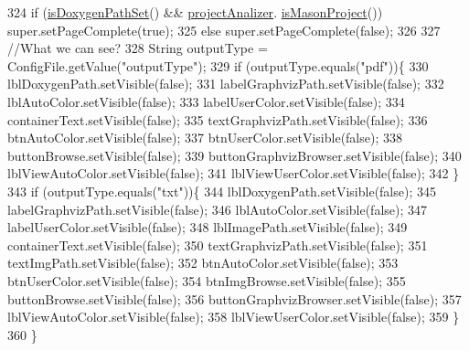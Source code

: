 \begin{DoxyCode}
324         \textcolor{keywordflow}{if} (\hyperlink{classit_1_1isislab_1_1masonhelperdocumentation_1_1mason_1_1wizards_1_1_b___project_information_page_a0eec0bf0cf4211e377555c20f52abdb8}{isDoxygenPathSet}() && \hyperlink{classit_1_1isislab_1_1masonhelperdocumentation_1_1mason_1_1wizards_1_1_b___project_information_page_aa0397b2de6a01a90d6d2eb52645f5173}{projectAnalizer}.
      \hyperlink{classit_1_1isislab_1_1masonhelperdocumentation_1_1analizer_1_1_project_analizer_a57a1bbfb21c09b106d6fa90ad3709d35}{isMasonProject}()) super.setPageComplete(\textcolor{keyword}{true});
325         \textcolor{keywordflow}{else}    super.setPageComplete(\textcolor{keyword}{false});
326         
327         \textcolor{comment}{//What we can see?}
328         String outputType = ConfigFile.getValue(\textcolor{stringliteral}{"outputType"});
329         \textcolor{keywordflow}{if} (outputType.equals(\textcolor{stringliteral}{"pdf"}))\{
330             lblDoxygenPath.setVisible(\textcolor{keyword}{false});
331             labelGraphvizPath.setVisible(\textcolor{keyword}{false});
332             lblAutoColor.setVisible(\textcolor{keyword}{false});
333             labelUserColor.setVisible(\textcolor{keyword}{false});
334             containerText.setVisible(\textcolor{keyword}{false});
335             textGraphvizPath.setVisible(\textcolor{keyword}{false});
336             btnAutoColor.setVisible(\textcolor{keyword}{false});
337             btnUserColor.setVisible(\textcolor{keyword}{false});
338             buttonBrowse.setVisible(\textcolor{keyword}{false});
339             buttonGraphvizBrowser.setVisible(\textcolor{keyword}{false});
340             lblViewAutoColor.setVisible(\textcolor{keyword}{false});
341             lblViewUserColor.setVisible(\textcolor{keyword}{false});
342         \}
343         \textcolor{keywordflow}{if} (outputType.equals(\textcolor{stringliteral}{"txt"}))\{
344             lblDoxygenPath.setVisible(\textcolor{keyword}{false});
345             labelGraphvizPath.setVisible(\textcolor{keyword}{false});
346             lblAutoColor.setVisible(\textcolor{keyword}{false});
347             labelUserColor.setVisible(\textcolor{keyword}{false});
348             lblImagePath.setVisible(\textcolor{keyword}{false});
349             containerText.setVisible(\textcolor{keyword}{false});
350             textGraphvizPath.setVisible(\textcolor{keyword}{false});
351             textImgPath.setVisible(\textcolor{keyword}{false});
352             btnAutoColor.setVisible(\textcolor{keyword}{false});
353             btnUserColor.setVisible(\textcolor{keyword}{false});
354             btnImgBrowse.setVisible(\textcolor{keyword}{false});
355             buttonBrowse.setVisible(\textcolor{keyword}{false});
356             buttonGraphvizBrowser.setVisible(\textcolor{keyword}{false});
357             lblViewAutoColor.setVisible(\textcolor{keyword}{false});
358             lblViewUserColor.setVisible(\textcolor{keyword}{false});
359         \}   
360     \}
\end{DoxyCode}


